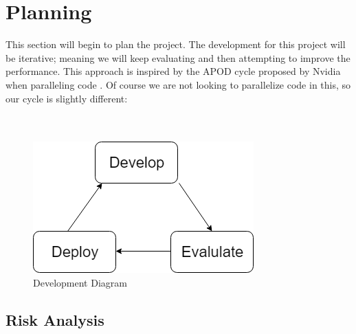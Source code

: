 \chapter{Planning} \label{plan}

This section will begin to plan the project. The development for this project will be iterative; meaning we will keep evaluating and then attempting to improve the performance. This approach is inspired by the APOD cycle proposed by Nvidia when paralleling code \cite{BradleyNvid}. Of course we are not looking to parallelize code in this, so our cycle is slightly different:\\\\\\

\begin{figure}[H]
\centering
\includegraphics{figures/diagram.png}
\caption{Development Diagram}
\end{figure}

\section{Risk Analysis} \label{risk}

